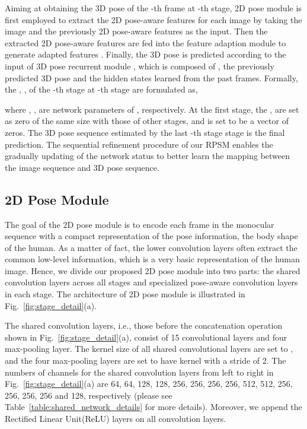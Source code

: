 \documentclass[10pt,twocolumn,letterpaper]{article}
\begin{document}
Aiming at obtaining the 3D pose  of the -th frame at -th stage, 2D pose module  is first employed to extract the 2D pose-aware features  for each image by taking the image  and the previously 2D pose-aware features  as the input. Then the extracted 2D pose-aware features  are fed into the feature adaption module  to generate adapted features . Finally, the 3D pose  is predicted according to the input of 3D pose recurrent module , which is composed of , the previously predicted 3D pose  and the hidden states  learned from the past frames. Formally, the , ,  of the -th stage at -th stage are formulated as, 

where , ,  are network parameters of , respectively. At the first stage, the ,  are set as zero of the same size with those of other stages, and  is set to be a vector of zeros. The 3D pose sequence  estimated by the last -th stage stage is the final prediction. The sequential refinement procedure of our RPSM enables the gradually updating of the network status to better learn the mapping between the image sequence and 3D pose sequence.

\subsection{2D Pose Module}
\label{sec:2d_pose_cnn}
The goal of the 2D pose module is to encode each frame in the monocular sequence with a compact representation of the pose information, \eg the body shape of the human. As a matter of fact, the lower convolution layers often extract the common low-level information, which is a very basic representation of the human image. Hence, we divide our proposed 2D pose module into two parts: the shared convolution layers across all stages and specialized pose-aware convolution layers in each stage. The architecture of 2D pose module is illustrated in Fig.~\ref{fig:stage_detail}(a). 

The shared convolution layers, i.e., those before the concatenation operation shown in Fig.~\ref{fig:stage_detail}(a), consist of 15 convolutional layers and four max-pooling layer. The kernel size of all shared convolutional layers are set to , and the four max-pooling layers are set to have  kernel with a stride of 2. The numbers of channels for the shared convolution layers from left to right in Fig.~\ref{fig:stage_detail}(a) are 64, 64, 128, 128, 256, 256, 256, 256, 512, 512, 256, 256, 256, 256 and 128, respectively (please see Table~\ref{table:shared_network_details} for more details). Moreover, we append the Rectified Linear Unit(ReLU) layers on all convolution layers. 
\end{document}
